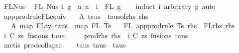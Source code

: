 \begin{isabellebody}
\isamarkupfalse%
\ FL{\isacharunderscore}{\kern0pt}Nus{}{\isacharcolon}{\kern0pt}\isanewline
\ \ {\isachardoublequoteopen}FL\ {\isacharparenleft}{\kern0pt}Nus{}\ i\ g{\isacharparenright}{\kern0pt}\ {\isacharequal}{\kern0pt}\ {\isacharbraceleft}{\kern0pt}n{\isachardot}{\kern0pt}\ n\ {\isacharplus}{\kern0pt}\ i\ {\isasymin}\ FL\ g{\isacharbraceright}{\kern0pt}{\isachardoublequoteclose}\isanewline
%
\isadelimproof
\ \ %
\endisadelimproof
%
\isatagproof
{}\isamarkupfalse%
\ {\isacharparenleft}{\kern0pt}induct\ i\ arbitrary{\isacharcolon}{\kern0pt}\ g{\isacharparenright}{\kern0pt}\ auto%
\endisatagproof
{\isafoldproof}%
%
\isadelimproof
\isanewline
%
\endisadelimproof
\isanewline
\isanewline
{}\isamarkupfalse%
\ app{\isacharunderscore}{\kern0pt}prodrule{\isacharunderscore}{\kern0pt}FL{\isacharunderscore}{\kern0pt}equiv{\isacharcolon}{\kern0pt}\isanewline
\ \ \ A{}{\isacharcolon}{\kern0pt}\ {\isachardoublequoteopen}taus\ {\isacharequal}{\kern0pt}\ taus{\isacharunderscore}{\kern0pt}of{\isacharunderscore}{\kern0pt}rhs\ rhs{\isachardoublequoteclose}\isanewline
\ \ \ A{}{\isacharcolon}{\kern0pt}\ {\isachardoublequoteopen}map\ FLty\ taus\ {\isacharequal}{\kern0pt}\ map\ FL\ Ts{\isachardoublequoteclose}\isanewline
\ \ \ {\isachardoublequoteopen}FL\ {\isacharparenleft}{\kern0pt}app{\isacharunderscore}{\kern0pt}prodrule\ Ts\ rhs{\isacharparenright}{\kern0pt}\ {\isacharequal}{\kern0pt}\ FLrhs\ rhs{\isachardoublequoteclose}\isanewline
%
\isadelimproof
%
\endisadelimproof
%
\isatagproof
{}\isamarkupfalse%
\ {\isacharminus}{\kern0pt}\isanewline
\ \ \isamarkupfalse%
\ i\ C\ zs\ fusions\ taus{\isacharprime}{\kern0pt}\ \isanewline
\ \ \ \ prod{\isacharunderscore}{\kern0pt}rhs{\isacharcolon}{\kern0pt}\ {\isachardoublequoteopen}rhs\ {\isacharequal}{\kern0pt}\ {\isacharparenleft}{\kern0pt}i{\isacharcomma}{\kern0pt}\ {\isacharparenleft}{\kern0pt}C{\isacharcomma}{\kern0pt}\ zs{\isacharparenright}{\kern0pt}{\isacharcomma}{\kern0pt}\ fusions{\isacharcomma}{\kern0pt}\ taus{\isacharprime}{\kern0pt}{\isacharparenright}{\kern0pt}{\isachardoublequoteclose}\isanewline
\ \ \ \isamarkupfalse%
\ {\isacharparenleft}{\kern0pt}metis\ prod{\isachardot}{\kern0pt}collapse{\isacharparenright}{\kern0pt}\isanewline
\isanewline
\ \ \isamarkupfalse%
\ taus{\isacharcolon}{\kern0pt}\ {\isachardoublequoteopen}taus{\isacharprime}{\kern0pt}\ {\isacharequal}{\kern0pt}\ taus{\isachardoublequoteclose}\isanewline

\end{isabellebody}
